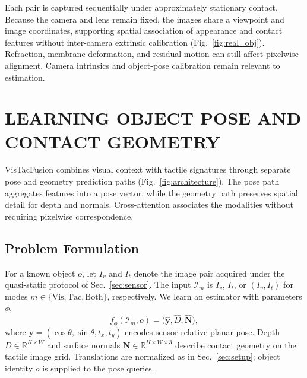 \documentclass[letterpaper,10pt,conference]{ieeeconf}
\newcommand{\method}{VisTacFusion}
\begin{document}
Each pair is captured sequentially under approximately stationary contact.
Because the camera and lens remain fixed, the images share a viewpoint and image coordinates, supporting spatial association of appearance and contact features without inter-camera extrinsic calibration (Fig.~\ref{fig:real_obj}). Refraction, membrane deformation, and residual motion can still affect pixelwise alignment. Camera intrinsics and object-pose calibration remain relevant to estimation.\unskip




\section{LEARNING OBJECT POSE AND CONTACT GEOMETRY} \label{sec:method}

\method{} combines visual context with tactile signatures through separate pose and geometry prediction paths (Fig.~\ref{fig:architecture}).
The pose path aggregates features into a pose vector, while the geometry path preserves spatial detail for depth and normals. Cross-attention associates the modalities without requiring pixelwise correspondence.

\subsection{Problem Formulation} \label{sec:problem}

For a known object $o$, let $I_v$ and $I_t$ denote the image pair acquired under the quasi-static protocol of Sec.~\ref{sec:sensor}. The input $\mathcal I_m$ is $I_v$, $I_t$, or $(I_v,I_t)$ for modes $m\in\{\mathrm{Vis},\mathrm{Tac},\mathrm{Both}\}$, respectively. We learn an estimator with parameters $\phi$,
\begin{equation}
 f_\phi(\mathcal I_m,o)=\bigl(\widehat{\mathbf y},\widehat D,\widehat{\mathbf N}\bigr),
 \label{eq:problem}
\end{equation}
where $\mathbf y=(\cos\theta,\sin\theta,t_x,t_y)$ encodes sensor-relative planar pose. Depth $D\in\mathbb R^{H\times W}$ and surface normals $\mathbf N\in\mathbb R^{H\times W\times3}$ describe contact geometry on the tactile image grid. Translations are normalized as in Sec.~\ref{sec:setup}; object identity $o$ is supplied to the pose queries.
\end{document}
